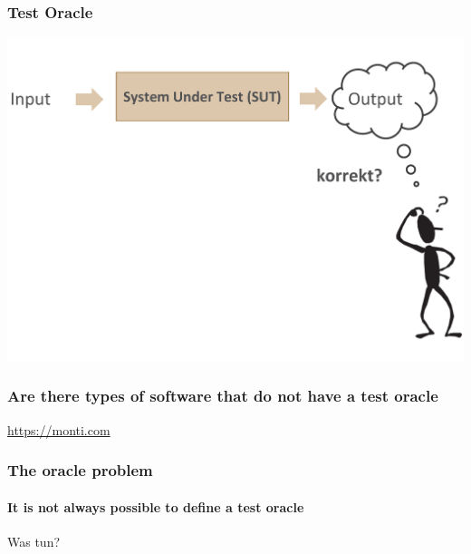 \begin{frame}
\frametitle{Test Oracle}
  \begin{center}
  \includegraphics[width=\textwidth]{images/Qualitaetssicherung/abbildungen/TestOracle}
  \end{center}
\end{frame}


\begin{frame}
\frametitle{Are there types of software that do not have a test oracle}
  \begin{center}
  \url{https://monti.com}  %
  \end{center}
\end{frame}


\begin{frame}
\frametitle{The oracle problem}
\framesubtitle{It is not always possible to define a test oracle}
  \begin{center}
  \end{center}
	Was tun? \\
\end{frame}

